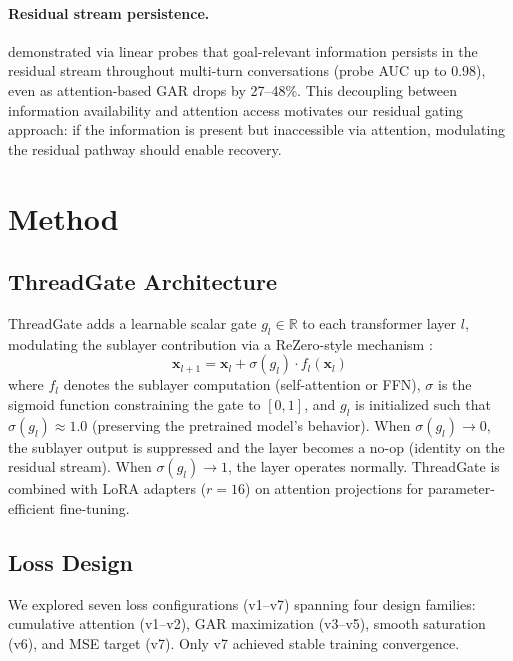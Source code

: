 \documentclass[11pt]{article}
\begin{document}
\paragraph{Residual stream persistence.}
\citet{dongre2026} demonstrated via linear probes that goal-relevant information persists in the residual stream throughout multi-turn conversations (probe AUC up to 0.98), even as attention-based GAR drops by 27--48\%. This decoupling between information availability and attention access motivates our residual gating approach: if the information is present but inaccessible via attention, modulating the residual pathway should enable recovery.

\section{Method}
\label{sec:method}

\subsection{ThreadGate Architecture}

ThreadGate adds a learnable scalar gate $g_l \in \mathbb{R}$ to each transformer layer $l$, modulating the sublayer contribution via a ReZero-style mechanism \citep{bachlechner2021rezero}:
\begin{equation}
    \mathbf{x}_{l+1} = \mathbf{x}_l + \sigma(g_l) \cdot f_l(\mathbf{x}_l)
\label{eq:gate}
\end{equation}
where $f_l$ denotes the sublayer computation (self-attention or FFN), $\sigma$ is the sigmoid function constraining the gate to $[0, 1]$, and $g_l$ is initialized such that $\sigma(g_l) \approx 1.0$ (preserving the pretrained model's behavior). When $\sigma(g_l) \to 0$, the sublayer output is suppressed and the layer becomes a no-op (identity on the residual stream). When $\sigma(g_l) \to 1$, the layer operates normally. ThreadGate is combined with LoRA adapters \citep{hu2022lora} ($r=16$) on attention projections for parameter-efficient fine-tuning.

\subsection{Loss Design}
\label{sec:loss}

We explored seven loss configurations (v1--v7) spanning four design families: cumulative attention (v1--v2), GAR maximization (v3--v5), smooth saturation (v6), and MSE target (v7). Only v7 achieved stable training convergence.
\end{document}
